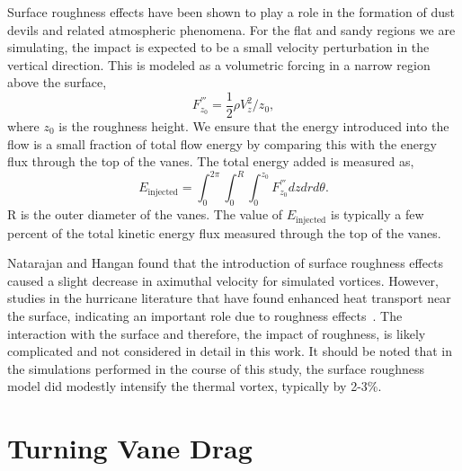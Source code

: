 
Surface roughness effects have been shown to play a role in the
formation of dust devils and related atmospheric
phenomena\cite{oke1987boundary}. For the flat and sandy
regions we are simulating, the impact is expected to be a small velocity
perturbation  in the vertical direction. This is modeled as a volumetric
forcing in a narrow region above the surface, 
\begin{equation}
 F^{'''}_{z_0} = \frac{1}{2}\rho V_z^2/z_{0}, 
\end{equation}
where $z_{0}$ is the roughness height. We ensure that the energy
introduced into the flow is a small fraction of total flow energy by comparing
this with the energy flux through the top of the vanes. The total energy
added is measured as,  
\begin{equation}
 E_{\text{injected}} = \int_0^{2\pi} \int_0^R \int_0^{z_0} F^{'''}_{z_0}
  dz dr d\theta.  
\end{equation}
R is the outer diameter of the vanes. 
The value of $E_{\text{injected}}$ is typically a few percent of the
total kinetic energy flux measured through the top of the
vanes.

Natarajan and Hangan\cite{Natarajan2012577} found that the introduction
of surface roughness effects caused a slight decrease in aximuthal
velocity for simulated vortices. However, studies in the hurricane
literature that have found enhanced heat transport near the surface,
indicating an important role due to roughness
effects~\cite{Zeng2010,GRL:GRL50047,hurricane_drag}. The interaction
with the surface and therefore, the impact of roughness, is likely
complicated and not considered in detail in this work. It should be
noted that in the simulations performed in the course of this study, the
surface roughness model did modestly intensify the thermal vortex,
typically by 2-3\%.  


\section{Turning Vane Drag}

